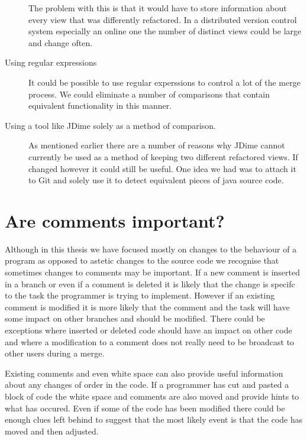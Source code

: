 \begin{description}
    The problem with this is that it would have to store information about every view that was differently refactored.  In a distributed version control system especially an online one the number of distinct views could be large and change often.   
  \item [Using regular expressions]
   It could be possible to use regular experssions to control a lot of the merge process.  We could eliminate a number of comparisons that contain equivalent functionality in this manner.
  \item [Using a tool like JDime solely as a method of comparison.]
    As mentioned earlier there are a number of reasons why JDime cannot currently be used as a method of keeping two different refactored views. If changed however it could still be useful.  One idea we had was to attach it to Git and solely use it to detect equivalent pieces of java source code.
\end{description}

\section{Are comments important?}
Although in this thesis we have focused mostly on changes to the behaviour of a program as opposed to astetic changes to the source code we recognise that sometimes changes to comments may be important.  If a new comment is inserted in a branch or even if a comment is deleted it is likely that the change is specifc to the task the programmer is trying to implement.  However if an existing comment is modified it is more likely that the comment and the task will have some impact on other branches and should be modified.  There could be exceptions where inserted or deleted code should have an impact on other code and where a modification to a comment does not really need to be broadcast to other users during a merge.

Existing comments and even white space can also provide useful information about any changes of order in the code.  If a programmer has cut and pasted a block of code the white space and comments are also moved and provide hints to what has occured.  Even if some of the code has been modified there could be enough clues left behind to suggest that the most likely event is that the code has moved and then adjusted.

